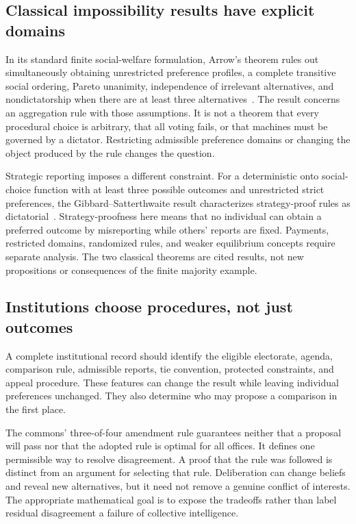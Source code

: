 \subsection{Classical impossibility results have explicit domains}
In its standard finite social-welfare formulation, Arrow's theorem rules out simultaneously obtaining unrestricted preference profiles, a complete transitive social ordering, Pareto unanimity, independence of irrelevant alternatives, and nondictatorship when there are at least three alternatives~\cite{MS:arrow}. The result concerns an aggregation rule with those assumptions. It is not a theorem that every procedural choice is arbitrary, that all voting fails, or that machines must be governed by a dictator. Restricting admissible preference domains or changing the object produced by the rule changes the question.

Strategic reporting imposes a different constraint. For a deterministic onto social-choice function with at least three possible outcomes and unrestricted strict preferences, the Gibbard--Satterthwaite result characterizes strategy-proof rules as dictatorial~\cite{MS:gibbard,MS:satterthwaite}. Strategy-proofness here means that no individual can obtain a preferred outcome by misreporting while others' reports are fixed. Payments, restricted domains, randomized rules, and weaker equilibrium concepts require separate analysis. The two classical theorems are cited results, not new propositions or consequences of the finite majority example.

\subsection{Institutions choose procedures, not just outcomes}
A complete institutional record should identify the eligible electorate, agenda, comparison rule, admissible reports, tie convention, protected constraints, and appeal procedure. These features can change the result while leaving individual preferences unchanged. They also determine who may propose a comparison in the first place.

The commons' three-of-four amendment rule guarantees neither that a proposal will pass nor that the adopted rule is optimal for all offices. It defines one permissible way to resolve disagreement. A proof that the rule was followed is distinct from an argument for selecting that rule. Deliberation can change beliefs and reveal new alternatives, but it need not remove a genuine conflict of interests. The appropriate mathematical goal is to expose the tradeoffs rather than label residual disagreement a failure of collective intelligence.

